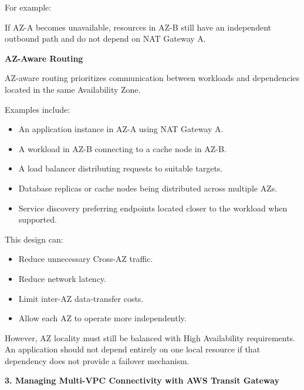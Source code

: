 For example:

\begin{Shaded}
\begin{Highlighting}[]
\end{Highlighting}
\end{Shaded}

If AZ-A becomes unavailable, resources in AZ-B still have an independent
outbound path and do not depend on NAT Gateway A.

\vspace{0.5em}\noindent\textbf{AZ-Aware Routing}\par

AZ-aware routing prioritizes communication between workloads and
dependencies located in the same Availability Zone.

Examples include:

\begin{itemize}
\tightlist
\item
  An application instance in AZ-A using NAT Gateway A.
\item
  A workload in AZ-B connecting to a cache node in AZ-B.
\item
  A load balancer distributing requests to suitable targets.
\item
  Database replicas or cache nodes being distributed across multiple
  AZs.
\item
  Service discovery preferring endpoints located closer to the workload
  when supported.
\end{itemize}

This design can:

\begin{itemize}
\tightlist
\item
  Reduce unnecessary Cross-AZ traffic.
\item
  Reduce network latency.
\item
  Limit inter-AZ data-transfer costs.
\item
  Allow each AZ to operate more independently.
\end{itemize}

However, AZ locality must still be balanced with High Availability
requirements. An application should not depend entirely on one local
resource if that dependency does not provide a failover mechanism.

\vspace{0.5em}\noindent\textbf{3. Managing Multi-VPC Connectivity with AWS Transit
Gateway}\par

